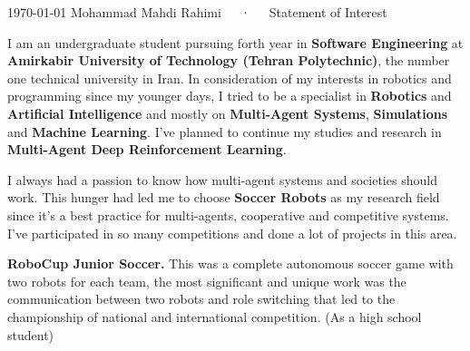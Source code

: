 \documentclass[11pt, a4paper]{awesome-cv}
\begin{document}
\makecvheader[R]

\makecvfooter
  {\today}
  {Mohammad Mahdi Rahimi~~~·~~~Statement of Interest}
  {}

\makelettertitle

\begin{cvletter}
I am an undergraduate student pursuing forth year in \textbf{Software Engineering} at \textbf{Amirkabir University of Technology (Tehran Polytechnic)}, the number one technical university in Iran. In consideration of my interests in robotics and programming since my younger days, I tried to be a specialist in \textbf{Robotics} and \textbf{Artificial Intelligence} and mostly on  \textbf{Multi-Agent Systems}, \textbf{Simulations} and \textbf{Machine Learning}. I've planned to continue my studies and research in \textbf{Multi-Agent Deep Reinforcement Learning}.

I always had a passion to know how multi-agent systems and societies should work. This hunger had led me to choose \textbf{Soccer Robots} as my research field since it's a best practice for multi-agents, cooperative and competitive systems.
I've participated in so many competitions and done a lot of projects in this area.

\textbf{RoboCup Junior Soccer.} This was a complete autonomous soccer game with two robots for each team, the most significant and unique work was the communication between two robots and role switching that led to the championship of national and international competition. (As a high school student)


\end{cvletter}
\end{document}
